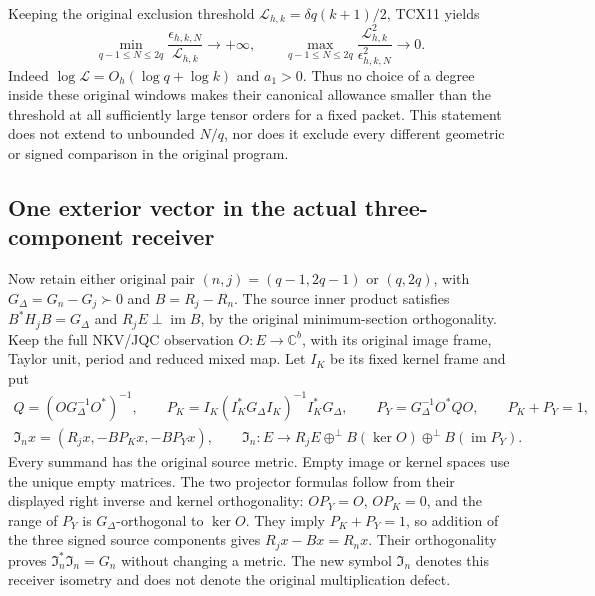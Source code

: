 \documentclass[11pt,a4paper]{article}
\begin{document}
Keeping the original exclusion threshold
$\mathcal L_{h,k}=\delta q(k+1)/2$, TCX11 yields
\begin{equation}\tag{TCX12}
 \boxed{\min_{q-1\le N\le2q}
               \frac{\epsilon_{h,k,N}}{\mathcal L_{h,k}}
       \longrightarrow+\infty,\qquad
 \max_{q-1\le N\le2q}
       \frac{\mathcal L_{h,k}^2}{\epsilon_{h,k,N}^2}
       \longrightarrow0.}
\end{equation}
Indeed $\log\mathcal L=O_h(\log q+\log k)$ and $a_1>0$.
Thus no choice of a degree inside these original windows makes their
canonical allowance smaller than the threshold at all sufficiently
large tensor orders for a fixed packet. This statement does not
extend to unbounded $N/q$, nor does it exclude every different
geometric or signed comparison in the original program.

\subsection{One exterior vector in the actual three-component receiver}

Now retain either original pair $(n,j)=(q-1,2q-1)$ or $(q,2q)$,
with $G_\Delta=G_n-G_j\succ0$ and $B=R_j-R_n$.
The source inner product satisfies $B^*H_jB=G_\Delta$ and
$R_jE\perp\operatorname{im}B$, by the original minimum-section
orthogonality. Keep the full NKV/JQC observation
$O:E\to\mathbb C^b$, with its original image frame, Taylor unit,
period and reduced mixed map. Let $I_K$ be its fixed kernel frame and
put
\begin{equation}\tag{TCX13}
\begin{gathered}
 Q=(OG_\Delta^{-1}O^*)^{-1},\qquad
 P_K=I_K(I_K^*G_\Delta I_K)^{-1}I_K^*G_\Delta,\qquad
 P_Y=G_\Delta^{-1}O^*QO,\qquad P_K+P_Y=1,\\
 \mathfrak I_n x=(R_jx,-BP_Kx,-BP_Yx),\qquad
 \mathfrak I_n:E\longrightarrow
 R_jE\mathbin{\oplus}^{\perp}B(\ker O)
                      \mathbin{\oplus}^{\perp}B(\operatorname{im}P_Y).
\end{gathered}
\end{equation}
Every summand has the original source metric. Empty image or kernel
spaces use the unique empty matrices. The two projector formulas
follow from their displayed right inverse and kernel orthogonality:
$OP_Y=O$, $OP_K=0$, and the range of $P_Y$ is
$G_\Delta$-orthogonal to $\ker O$. They imply $P_K+P_Y=1$,
so addition of the three signed source components gives
$R_jx-Bx=R_nx$. Their orthogonality proves
$\mathfrak I_n^*\mathfrak I_n=G_n$ without changing a metric.
The new symbol $\mathfrak I_n$ denotes this receiver isometry and
does not denote the original multiplication defect.
\end{document}
